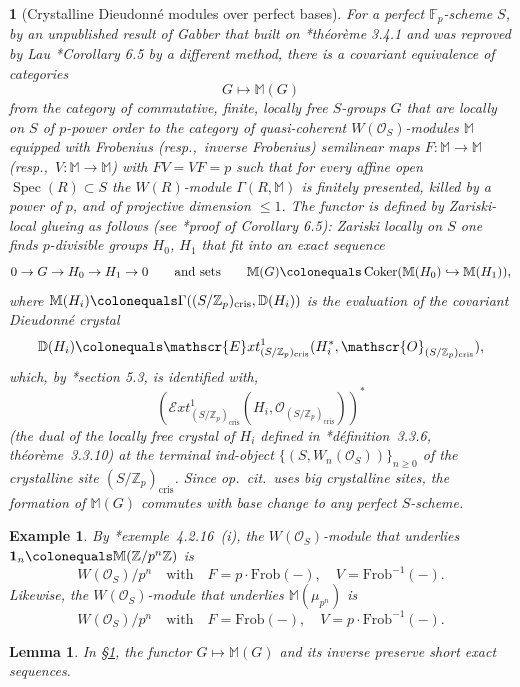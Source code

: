 \documentclass[11pt, reqno]{amsart}
\newcommand{\me}[1]{{\color{Plum} \sf \it{ {\scriptsize ``#1''} }}}
\newcommand{\bD}{\mathbb{D}}
\newcommand{\bF}{\mathbb{F}}
\newcommand{\bM}{\mathbb{M}}
\newcommand{\bZ}{\mathbb{Z}}
\newcommand{\sE}{\mathscr{E}}
\newcommand{\sO}{\mathscr{O}}
\DeclareMathOperator{\Coker}{Coker}	%
\DeclareMathOperator{\Ext}{Ext}		%
\DeclareMathOperator{\Spec}{Spec}		%
\newcommand{\ce}{\colonequals}
\newcommand{\cris}{{\mathrm{cris}}}		%
\newcommand{\Frob}{\mathrm{Frob}}			%
\newcommand{\hra}{\hookrightarrow}
\renewcommand{\i}{^{-1}}
\newcommand{\ra}{\rightarrow}
\providecommand{\uref}[1]{{\upshape\ref{#1}}}
\providecommand{\uS}{{\upshape\S}}
\newcommand{\blem}{\begin{lemma}}
\newcommand{\elem}{\end{lemma}}
\newcommand{\beg}{\begin{eg}}
\newcommand{\eeg}{\end{eg}}
\newcommand{\x}{\text}
\providecommand{\qxq}[1]{\quad\text{#1}\quad}
\newcommand{\q}{\quad}
\newcommand{\qq}{\quad\quad}
\numberwithin{equation}{numberingbase}
\theoremstyle{thms}
\newtheorem{lemma}[numberingbase]{Lemma}
\theoremstyle{claims}
\theoremstyle{defs}
\newtheorem{eg}[numberingbase]{Example}
\theoremstyle{thms}
\theoremstyle{defs}
\theoremstyle{subsection-tweak}
\newtheorem{pp}[numberingbase]{}
\newcommand{\bpp}{\begin{pp}}
\newcommand{\epp}{\end{pp}}
\theoremstyle{subsection-tweak}
\newcommand{\bb}{\boldsymbol}		%
\begin{document}

\bpp[Crystalline Dieudonn\'{e} modules over perfect bases] \label{Gab-eq}
For a perfect $\bF_p$-scheme $S$, by an unpublished result of Gabber that built on \cite{Ber80}*{th\'{e}or\`{e}me 3.4.1} and was reproved by Lau \cite{Lau13}*{Corollary 6.5} by a different method, there is a covariant equivalence of categories
\[
G \mapsto \bM(G)
\]
from the category of commutative, finite, locally free $S$-groups $G$ that are locally on $S$ of $p$-power order to the category of quasi-coherent %
$W(\sO_S)$-modules $\bM$ equipped with Frobenius (resp.,~inverse Frobenius) semilinear maps $F\colon \bM \ra \bM$ (resp.,~$V\colon \bM \ra \bM$) with $FV = VF = p$ such that for every  affine open $\Spec(R) \subset S$ the $W(R)$-module $\Gamma(R, \bM)$ is finitely presented, killed by a power of $p$, and of projective dimension $\le 1$. The functor is defined by Zariski-local glueing as follows (see \cite{Lau13}*{proof of Corollary 6.5}): Zariski locally on $S$ one finds $p$-divisible groups $H_0$, $H_1$ that fit into an exact sequence
\[
0 \ra G \ra H_0 \ra H_1 \ra 0 \qq \x{and sets} \qq \bM(G) \ce \Coker(\bM(H_0) \hra \bM(H_1)),
\]
where $\bM(H_i) \ce \Gamma((S/\bZ_p)_\cris, \bD(H_i))$ is the evaluation of the covariant Dieudonn\'{e} crystal 
\[
\bD(H_i) \ce \sE xt^1_{(S/\bZ_p)_\cris}(H_i^*, \sO_{(S/\bZ_p)_\cris}), 
\]
which, by \cite{BBM82}*{section 5.3}, is identified with,
 \[
(\sE xt^1_{(S/\bZ_p)_\cris}(H_i, \sO_{(S/\bZ_p)_\cris}))^* 
\]
(the dual of the locally free crystal of $H_i$ defined in \cite{BBM82}*{d\'{e}finition~3.3.6, th\'{e}or\`{e}me~3.3.10}) at the terminal ind-object $\{(S, W_n(\sO_S))\}_{n \ge 0}$ of the crystalline site $(S/\bZ_p)_\cris$. %
Since \emph{op.~cit.}~uses big crystalline sites, the formation of $\bM(G)$ commutes with base change to any perfect $S$-scheme. 
\epp



\beg \label{Gab-eq-ex}
By \cite{BBM82}*{exemple~4.2.16~(i)}, the $W(\sO_S)$-module that underlies $\bb1_n \ce \bM(\bZ/p^n\bZ)$ is
\[
W(\sO_S)/p^n \qxq{with} F = p\cdot\Frob(-), \q V = \Frob\i(-).
\]
Likewise, the $W(\sO_S)$-module that underlies $\bM(\mu_{p^n})$ is  
\[
W(\sO_S)/p^n \qxq{with} F = \Frob(-), \q V = p\cdot\Frob\i(-).
\] 
\eeg



\blem \label{MG-exact}
In \uS\uref{Gab-eq}, the functor $G \mapsto \bM(G)$ and its inverse preserve short exact sequences. 
\elem
\end{document}
